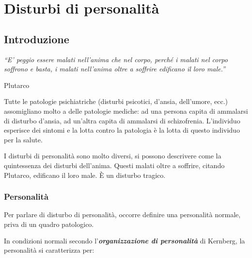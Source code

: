 \section{Disturbi di personalità}

\subsection{Introduzione}

\emph{``E' peggio essere malati nell'anima che nel corpo, perché i
malati nel corpo soffrono e basta, i malati nell'anima oltre a soffrire
edificano il loro male.''}

Plutarco

Tutte le patologie psichiatriche (disturbi psicotici, d'ansia,
dell'umore, ecc.) assomigliano molto a delle patologie mediche: ad una
persona capita di ammalarsi di disturbo d'ansia, ad un'altra capita di
ammalarsi di schizofrenia. L'individuo esperisce dei sintomi e la lotta
contro la patologia è la lotta di questo individuo per la salute.

I disturbi di personalità sono molto diversi, si possono descrivere come
la quintessenza dei disturbi dell'anima. Questi malati oltre a soffrire,
citando Plutarco, edificano il loro male. È un disturbo tragico.

\subsubsection{Personalità}

Per parlare di disturbo di personalità, occorre definire una personalità
normale, priva di un quadro patologico.

In condizioni normali secondo l'\textbf{\emph{organizzazione di
personalità}} di Kernberg, la personalità si caratterizza per:

